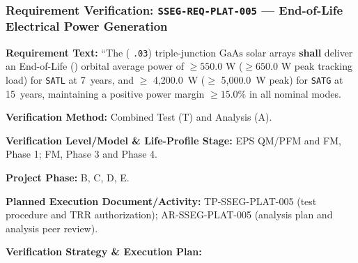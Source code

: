 \subsubsection{Requirement Verification: \texttt{SSEG-REQ-PLAT-005} --- End-of-Life Electrical Power Generation}
\label{ver:SSEG-REQ-PLAT-005}
\textbf{Requirement Text:} ``The  ( \texttt{.03}) triple-junction $\mathrm{GaAs}$ solar arrays \textbf{shall} deliver an End-of-Life () orbital average power of $\ge 550.0\text{ W}$ ($\ge 650.0\text{ W}$ peak tracking load) for \texttt{SATL} at 7~years, and $\ge$ 4,200.0~W ($\ge$ 5,000.0~W peak) for \texttt{SATG} at 15~years, maintaining a positive power margin $\ge 15.0\%$ in all nominal modes.
\par\textbf{Verification Method:} Combined Test (T) and Analysis (A).
\par\textbf{Verification Level/Model \& Life-Profile Stage:} EPS QM/PFM and FM, Phase 1; FM, Phase 3 and Phase 4.
\par\textbf{Project Phase:} B, C, D, E.
\par\textbf{Planned Execution Document/Activity:} TP-SSEG-PLAT-005 (test procedure and TRR authorization); AR-SSEG-PLAT-005 (analysis plan and analysis peer review).
\par\textbf{Verification Strategy \& Execution Plan:}
